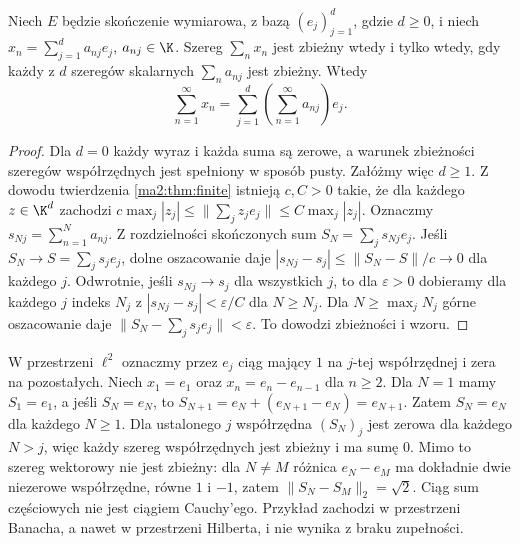 \begin{twierdzenie}
\label{ma2:thm:series-coordinates}
Niech $E$ będzie skończenie wymiarowa, z bazą
$(e_j)_{j=1}^d$, gdzie $d\ge0$, i niech
$x_n=\sum_{j=1}^d a_{nj}e_j$, $a_{nj}\in\K$.
Szereg $\sum_n x_n$ jest zbieżny wtedy i tylko wtedy,
gdy każdy z $d$ szeregów skalarnych $\sum_n a_{nj}$
jest zbieżny. Wtedy
\[
 \sum_{n=1}^\infty x_n
 =\sum_{j=1}^d\left(\sum_{n=1}^\infty a_{nj}\right)e_j.
\]
\end{twierdzenie}
\begin{proof}
Dla $d=0$ każdy wyraz i każda suma są zerowe, a warunek
zbieżności szeregów współrzędnych jest spełniony w sposób pusty.
Załóżmy więc $d\ge1$.
Z dowodu twierdzenia \ref{ma2:thm:finite} istnieją $c,C>0$
takie, że dla każdego $z\in\K^d$ zachodzi
$c\max_j|z_j|\le\|\sum_j z_je_j\|\le C\max_j|z_j|$.
Oznaczmy $s_{Nj}=\sum_{n=1}^N a_{nj}$.
Z rozdzielności skończonych sum $S_N=\sum_j s_{Nj}e_j$.
Jeśli $S_N\to S=\sum_j s_je_j$, dolne oszacowanie daje
$|s_{Nj}-s_j|\le\|S_N-S\|/c\to0$ dla każdego $j$.
Odwrotnie, jeśli $s_{Nj}\to s_j$ dla wszystkich $j$, to
dla $\varepsilon>0$ dobieramy dla każdego $j$ indeks $N_j$
z $|s_{Nj}-s_j|<\varepsilon/C$ dla $N\ge N_j$.
Dla $N\ge\max_j N_j$ górne oszacowanie daje
$\|S_N-\sum_j s_je_j\|<\varepsilon$.
To dowodzi zbieżności i wzoru.
\end{proof}

\begin{przyklad}
\label{ma2:ex:coordinate-series-not-norm}
W przestrzeni $\ell^2$ oznaczmy przez $e_j$ ciąg mający
$1$ na $j$-tej współrzędnej i zera na pozostałych.
Niech $x_1=e_1$ oraz $x_n=e_n-e_{n-1}$ dla $n\ge2$.
Dla $N=1$ mamy $S_1=e_1$, a jeśli $S_N=e_N$, to
$S_{N+1}=e_N+(e_{N+1}-e_N)=e_{N+1}$.
Zatem $S_N=e_N$ dla każdego $N\ge1$.
Dla ustalonego $j$ współrzędna $(S_N)_j$ jest zerowa
dla każdego $N>j$, więc każdy szereg współrzędnych jest
zbieżny i ma sumę $0$. Mimo to szereg wektorowy nie jest
zbieżny: dla $N\ne M$ różnica $e_N-e_M$ ma dokładnie
dwie niezerowe współrzędne, równe $1$ i $-1$, zatem
$\|S_N-S_M\|_2=\sqrt{2}$. Ciąg sum częściowych nie jest
ciągiem Cauchy'ego. Przykład zachodzi w przestrzeni Banacha,
a nawet w przestrzeni Hilberta, i nie wynika z braku zupełności.
\end{przyklad}

